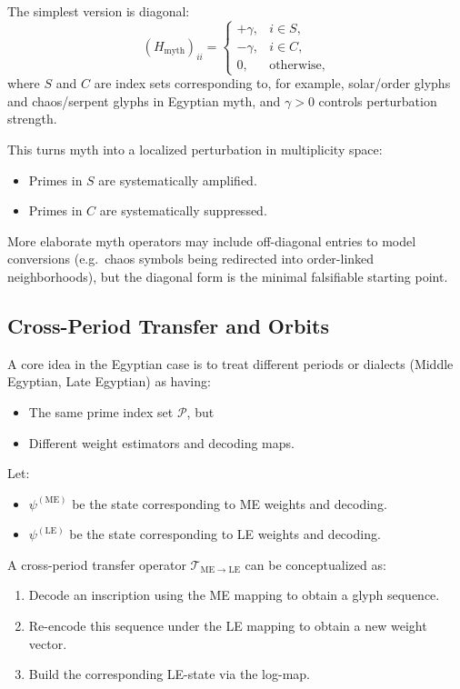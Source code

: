 \documentclass[11pt]{article}
\begin{document}
The simplest version is diagonal:
\[
(H_{\text{myth}})_{ii} =
\begin{cases}
+\gamma, & i\in S,\\
-\gamma, & i\in C,\\
0, & \text{otherwise},
\end{cases}
\]
where \(S\) and \(C\) are index sets corresponding to, for example,
solar/order glyphs and chaos/serpent glyphs in Egyptian myth, and
\(\gamma>0\) controls perturbation strength.

This turns myth into a localized perturbation in multiplicity space:
\begin{itemize}[nosep]
  \item Primes in \(S\) are systematically amplified.
  \item Primes in \(C\) are systematically suppressed.
\end{itemize}

More elaborate myth operators may include off-diagonal entries
to model conversions (e.g.\ chaos symbols being redirected into
order-linked neighborhoods), but the diagonal form is the minimal
falsifiable starting point.

\subsection{Cross-Period Transfer and Orbits}

A core idea in the Egyptian case is to treat different periods or
dialects (Middle Egyptian, Late Egyptian) as having:
\begin{itemize}[nosep]
  \item The same prime index set \(\mathcal{P}\), but
  \item Different weight estimators and decoding maps.
\end{itemize}

Let:
\begin{itemize}[nosep]
  \item \(\psi^{(\mathrm{ME})}\) be the state corresponding to ME
        weights and decoding.
  \item \(\psi^{(\mathrm{LE})}\) be the state corresponding to LE
        weights and decoding.
\end{itemize}

A cross-period transfer operator \(\mathcal{T}_{\mathrm{ME}\to\mathrm{LE}}\)
can be conceptualized as:
\begin{enumerate}[nosep]
  \item Decode an inscription using the ME mapping to obtain a glyph
        sequence.
  \item Re-encode this sequence under the LE mapping to obtain a new
        weight vector.
  \item Build the corresponding LE-state via the log-map.
\end{enumerate}
\end{document}
